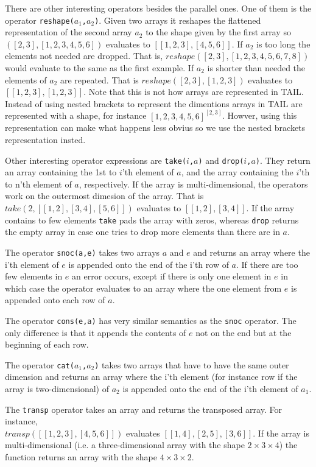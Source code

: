 \documentclass[11pt]{article}
\begin{document}
There are other interesting operators besides the parallel ones. One of them is the operator {\tt reshape($a_1$,$a_2$)}.
Given two arrays it reshapes the flattened representation of the second array $a_2$ to the shape given by the first array so $([2,3],[1,2,3,4,5,6])$ evaluates to $[[1,2,3],[4,5,6]]$. 
If $a_2$ is too long the elements not needed are dropped. That is, $reshape([2,3],[1,2,3,4,5,6,7,8])$ would evaluate to the same as the first example.
If $a_2$ is shorter than needed the elements of $a_2$ are repeated. That is $reshape([2,3],[1,2,3])$ evaluates to $[[1,2,3],[1,2,3]]$. Note that this is not how arrays are represented in TAIL. Instead of using nested brackets to represent the dimentions arrays in TAIL are represented with a shape, for instance $[1,2,3,4,5,6]^{[2,3]}$. Howver, using this representation can make what happens less obvius so we use the nested brackets representation insted. 

Other interesting operator expressions are {\tt take($i$,$a$)} and {\tt drop($i$,$a$)}.
They return an array containing the 1st to $i$'th element of $a$,
and the array containing the $i$'th to n'th element of $a$, respectively.
If the array is multi-dimensional, the operators work on the outermost dimesion of the array. That is $take(2,[[1,2],[3,4],[5,6]])$ evaluates to $[[1,2],[3,4]]$.
If the array contains to few elements {\tt take} pads the array with zeros,
whereas {\tt drop} returns the empty array in case one tries to drop more elements than there are in $a$. 

The operator {\tt snoc(a,e)} takes two arrays $a$ and $e$ and returns an array where the i'th element of $e$ is appended onto the end of the i'th row of $a$.
If there are too few elements in $e$ an error occurs,
except if there is only one element in $e$ in which case the operator evaluates to an array where the one element from $e$
is appended onto each row of $a$.

The operator {\tt cons(e,a)} has very similar semantics as the {\tt snoc} operator.
The only difference is that it appends the contents of $e$ not on the end but at the beginning of each row.

The operator {\tt cat($a_1$,$a_2$)} takes two arrays that have to have the same outer dimension and returns an array where the i'th element (for instance row if the array is two-dimensional) of $a_2$ is appended onto the end of the i'th element of $a_1$.

The {\tt transp} operator takes an array and returns the transposed array. For instance,\\
 $transp([[1,2,3],[4,5,6]])$ evaluates $[[1,4],[2,5],[3,6]]$. If the array is multi-dimensional (i.e. a three-dimensional array with the shape $2\times3\times4$) the function returns an array with the shape $4\times3\times2$.\\
\end{document}
